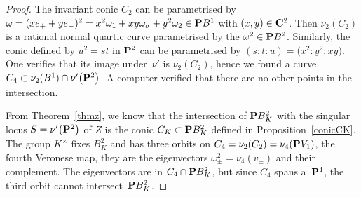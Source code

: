 \documentclass[pdftex]{sigma}
\numberwithin{equation}{section}
\begin{document}
\begin{proof}The invariant conic $C_2$ can be parametrised by
$\omega=(xe_++ye_-)^2=x^2\omega_1+xy\omega_\sigma+y^2\omega_2\in {\bf P} B^1$
with $(x,y)\in{\bf C}^2$. Then $\nu_2(C_2)$ is a rational normal quartic curve
parametrised by the $\omega^2\in{\bf P} B^2$.
Similarly, the conic defined by
$u^2=st$ in ${\bf P}^2$ can be parametrised by $(s:t:u)=\big(x^2:y^2:xy\big)$.
One verifies that its image under~$\nu'$ is $\nu_2(C_2)$,
hence we found a curve $C_4\subset \nu_2(B^1)\cap \nu'\big({\bf P}^2\big)$.
A computer verified that there are no other points in the intersection.

From Theorem~\ref{thmz},
we know that the intersection of ${\bf P} B^2_K$ with the singular locus $S=\nu'\big({\bf P}^2\big)$ of $Z$
is the conic $C_K\subset {\bf P} B^2_K$ defined in Proposition~\ref{conicCK}.
The group $K^\times$ fixes $B^2_K$ and
has three orbits on $C_4=\nu_2(C_2)=\nu_4({\bf P} V_1)$, the fourth Veronese map,
they are the eigenvectors $\omega_\pm^2=\nu_4(v_\pm)$ and their complement.
The eigenvectors are in $C_4\cap {\bf P} B^2_K$,
but since $C_4$ spans a~${\bf P}^4$, the third orbit cannot intersect~${\bf P} B^2_K$.
\end{proof}
\end{document}
